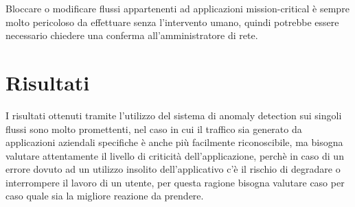 Bloccare o modificare flussi appartenenti ad applicazioni mission-critical è sempre molto pericoloso da effettuare senza l'intervento umano, quindi potrebbe essere necessario chiedere una conferma all'amministratore di rete.



\section{Risultati}

I risultati ottenuti tramite l'utilizzo del sistema di anomaly detection sui singoli flussi sono molto promettenti, nel caso in cui il traffico sia generato da applicazioni aziendali specifiche è anche più facilmente riconoscibile, ma bisogna valutare attentamente il livello di criticità dell'applicazione, perchè in caso di un errore dovuto ad un utilizzo insolito dell'applicativo c'è il rischio di degradare o interrompere il lavoro di un utente, per questa ragione bisogna valutare caso per caso quale sia la migliore reazione da prendere.

